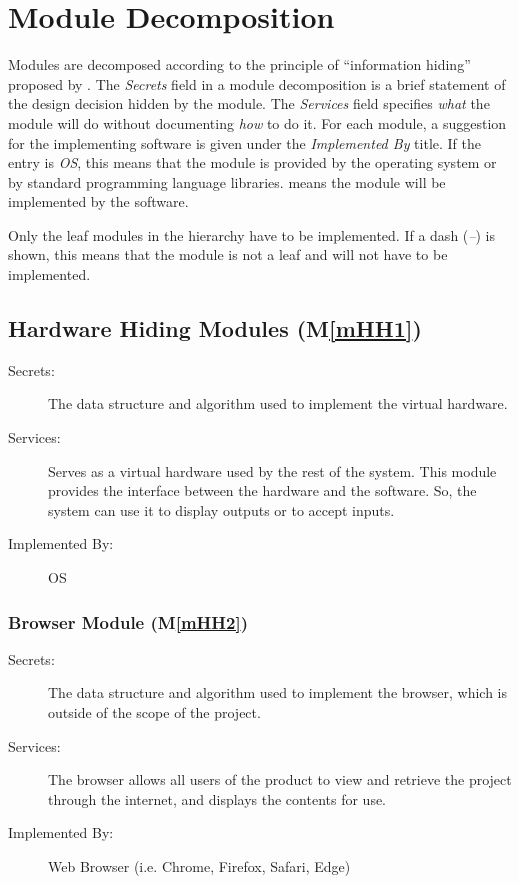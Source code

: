 \documentclass[12pt, titlepage]{article}
\newcommand{\mref}[1]{M\ref{#1}}
\begin{document}
\section{Module Decomposition} \label{SecMD}

Modules are decomposed according to the principle of ``information hiding''
proposed by \citet{ParnasEtAl1984}. The \emph{Secrets} field in a module
decomposition is a brief statement of the design decision hidden by the
module. The \emph{Services} field specifies \emph{what} the module will do
without documenting \emph{how} to do it. For each module, a suggestion for the
implementing software is given under the \emph{Implemented By} title. If the
entry is \emph{OS}, this means that the module is provided by the operating
system or by standard programming language libraries.  \emph{\progname{}} means the
module will be implemented by the \progname{} software.

Only the leaf modules in the hierarchy have to be implemented. If a dash
(\emph{--}) is shown, this means that the module is not a leaf and will not have
to be implemented.

\subsection{Hardware Hiding Modules (\mref{mHH1})}
\begin{description}
\item[Secrets:] The data structure and algorithm used to implement the virtual
  hardware.
\item[Services:] Serves as a virtual hardware used by the rest of the
  system. This module provides the interface between the hardware and the
  software. So, the system can use it to display outputs or to accept inputs.
\item[Implemented By:] OS
\end{description}

\subsubsection{Browser Module (\mref{mHH2})}
\begin{description}
\item[Secrets:] The data structure and algorithm used to implement the browser, which is outside of the scope of the project.
\item[Services:] The browser allows all users of the product to view and retrieve the project through the internet, and displays the contents for use.
\item[Implemented By:] Web Browser (i.e. Chrome, Firefox, Safari, Edge)
\end{description}
\end{document}
